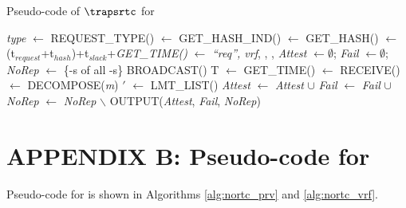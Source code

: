 \begin{algorithm}[hbt!]
\footnotesize
\caption{Pseudo-code of $\boldsymbol{\trapsrtc}$ for \vrf}\label{alg:rtc_vrf}
    \begin{algorithmic}[1]
        \State \textit{type} $\gets$ REQUEST\_TYPE() 
        \State \hashind $\gets$ GET\_HASH\_IND()
        \State \hash $\gets$ GET\_HASH(\hashind)
        \State \attesttime $\gets$ \netheight*(t$_{request}$+t$_{hash}$)+t$_{slack}$+\textit{GET\_TIME()}
        \State \Attreq $\gets$ \textit{``req'', vrf}, \hashind, \hash, \attesttime
        \State \textit{Attest} $\gets \emptyset$; \textit{Fail} $\gets \emptyset$; \textit{NoRep} $\gets$ \{\devid-s of all \prv-s\}
        \State BROADCAST(\Attreq)
        \State T $\gets$ GET\_TIME()
             \State \Attrep $\gets$ RECEIVE()
             \State [\devid, \parent, \attesttime, \hash, \lmt, \Authrep] $\gets$ DECOMPOSE(\textit{\textit{m}})
             \State \lmt$'$ $\gets$ LMT\_LIST(\devid) 
                     \State \textit{Attest} $\gets$ \textit{Attest} $\cup$ \devid
                 \Else
                     \State \textit{Fail} $\gets$ \textit{Fail} $\cup$ \devid
                 \EndIf
             \State \textit{NoRep} $\gets$ \textit{NoRep} $\backslash$ \devid
             \EndIf
        \EndWhile
        \State OUTPUT(\textit{Attest}, \textit{Fail}, \textit{NoRep})
    \EndWhile
    \end{algorithmic}
\end{algorithm} 


\newpage
\section*{APPENDIX B: Pseudo-code for \trapsnortc} \label{sec:code-nortc}

Pseudo-code for \trapsnortc is shown in Algorithms \ref{alg:nortc_prv} and \ref{alg:nortc_vrf}.

